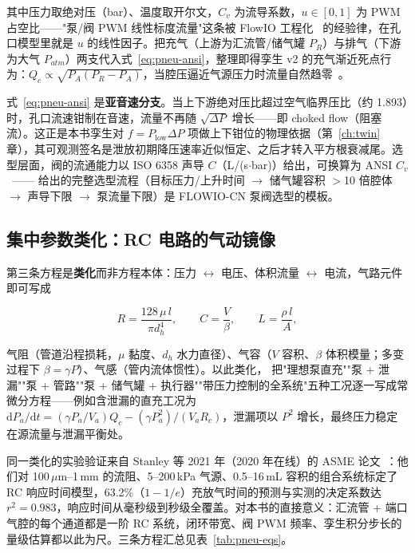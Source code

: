 其中压力取绝对压（bar）、温度取开尔文，$C_v$ 为流导系数，$u\in[0,1]$ 为 PWM 占空比——"泵/阀 PWM 线性标度流量"这条被 FlowIO 工程化~\cite{Shtarbanov2021} 的经验律，在孔口模型里就是 $u$ 的线性因子。把充气（上游为汇流管/储气罐 $P_R$）与排气（下游为大气 $P_{atm}$）两支代入式~\eqref{eq:pneu-ansi}，整理即得孪生 v2 的充气渐近死点行为：$Q_c \propto \sqrt{P_A(P_R-P_A)}$，当腔压逼近气源压力时流量自然趋零~\cite{Xavier2022Frontiers}。

式~\eqref{eq:pneu-ansi} 是\textbf{亚音速分支}。当上下游绝对压比超过空气临界压比（约 1.893）时，孔口流速钳制在音速，流量不再随 $\sqrt{\Delta P}$ 增长——即 choked flow（阻塞流）。这正是本书孪生对 $f = P_{\mathrm{low}}\Delta P$ 项做上下钳位的物理依据（第~\ref{ch:twin} 章），其可观测签名是泄放初期降压速率近似恒定、之后才转入平方根衰减尾。选型层面，阀的流通能力以 ISO 6358 声导 $C$（L/(s$\cdot$bar)）给出，可换算为 ANSI $C_v$~\cite{Xavier2022Frontiers}——\cite{Xavier2022Frontiers} 给出的完整选型流程（目标压力/上升时间 $\to$ 储气罐容积 $>$10 倍腔体 $\to$ 声导下限 $\to$ 泵流量下限）是 FLOWIO-CN 泵阀选型的模板。

\subsection{集中参数类化：RC 电路的气动镜像}

第三条方程是\textbf{类化}而非方程本体：压力 $\leftrightarrow$ 电压、体积流量 $\leftrightarrow$ 电流，气路元件即可写成~\cite{Xavier2020AIM}

\begin{equation}
R = \frac{128\,\mu\, l}{\pi d_h^4},
\qquad C = \frac{V}{\beta},
\qquad L = \frac{\rho\, l}{A},
\label{eq:pneu-rc}
\end{equation}

气阻（管道沿程损耗，$\mu$ 黏度、$d_h$ 水力直径）、气容（$V$ 容积、$\beta$ 体积模量；多变过程下 $\beta = \gamma P$）、气感（管内流体惯性）。以此类化，\cite{Xavier2020AIM} 把"理想泵直充""泵 + 泄漏""泵 + 管路""泵 + 储气罐 + 执行器""带压力控制的全系统"五种工况逐一写成常微分方程——例如含泄漏的直充工况为 $\mathrm{d}P_a/\mathrm{d}t = (\gamma P_a/V_a)Q_c - (\gamma P_a^2)/(V_a R_c)$，泄漏项以 $P^2$ 增长，最终压力稳定在源流量与泄漏平衡处。

同一类化的实验验证来自 Stanley 等 2021 年（2020 年在线）的 ASME 论文~\cite{Stanley2021}：他们对 100\,$\mu$m--1\,mm 的流阻、5--200\,kPa 气源、0.5--16\,mL 容积的组合系统标定了 RC 响应时间模型，63.2\%（$1-1/e$）充放气时间的预测与实测的决定系数达 $r^2 = 0.983$，响应时间从毫秒级到秒级全覆盖。对本书的直接意义：汇流管 + 端口气腔的每个通道都是一阶 RC 系统，闭环带宽、阀 PWM 频率、孪生积分步长的量级估算都以此为尺。三条方程汇总见表~\ref{tab:pneu-eqs}。

